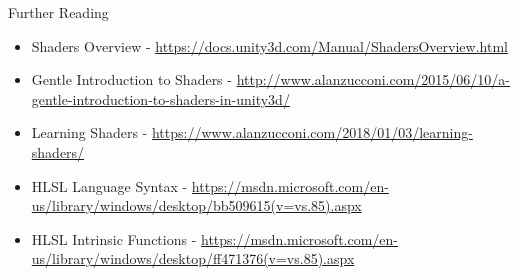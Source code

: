 \begin{frame}{Further Reading}
	\begin{itemize}
		\item Shaders Overview - \url{https://docs.unity3d.com/Manual/ShadersOverview.html}
		\item Gentle Introduction to Shaders - \url{http://www.alanzucconi.com/2015/06/10/a-gentle-introduction-to-shaders-in-unity3d/}
		\item Learning Shaders - \url{https://www.alanzucconi.com/2018/01/03/learning-shaders/}
		\item HLSL Language Syntax - \url{https://msdn.microsoft.com/en-us/library/windows/desktop/bb509615(v=vs.85).aspx}
		\item HLSL Intrinsic Functions - \url{https://msdn.microsoft.com/en-us/library/windows/desktop/ff471376(v=vs.85).aspx} 
	\end{itemize}
\end{frame}
